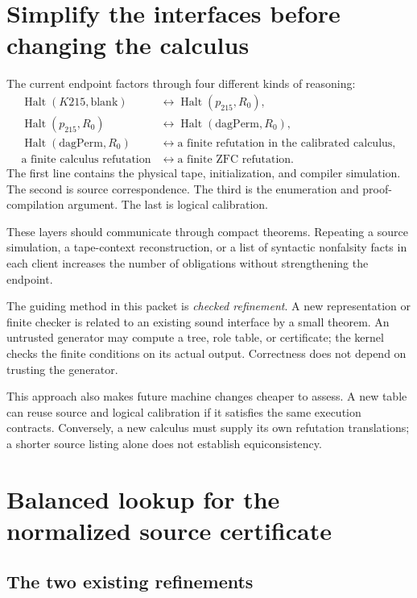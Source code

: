 \documentclass[11pt]{article}
\newcommand{\Halt}{\operatorname{Halt}}
\theoremstyle{remark}
\begin{document}
\section{Simplify the interfaces before changing the calculus}

The current endpoint factors through four different kinds of reasoning:
\[
\begin{aligned}
\Halt(K215,\mathrm{blank})
&\longleftrightarrow \Halt(p_{215},R_0),\\
\Halt(p_{215},R_0)
&\longleftrightarrow \Halt(\mathrm{dagPerm},R_0),\\
\Halt(\mathrm{dagPerm},R_0)
&\longleftrightarrow \text{a finite refutation in the calibrated calculus},\\
\text{a finite calculus refutation}
&\longleftrightarrow \text{a finite ZFC refutation}.
\end{aligned}
\]
The first line contains the physical tape, initialization, and compiler
simulation. The second is source correspondence. The third is the
enumeration and proof-compilation argument. The last is logical calibration.

These layers should communicate through compact theorems. Repeating a
source simulation, a tape-context reconstruction, or a list of syntactic
nonfalsity facts in each client increases the number of obligations without
strengthening the endpoint.

The guiding method in this packet is \emph{checked refinement}. A new
representation or finite checker is related to an existing sound interface
by a small theorem. An untrusted generator may compute a tree, role table,
or certificate; the kernel checks the finite conditions on its actual
output. Correctness does not depend on trusting the generator.

This approach also makes future machine changes cheaper to assess. A new
table can reuse source and logical calibration if it satisfies the same
execution contracts. Conversely, a new calculus must supply its own
refutation translations; a shorter source listing alone does not establish
equiconsistency.

\section{Balanced lookup for the normalized source certificate}
\label{sec:source}

\subsection{The two existing refinements}
\end{document}
